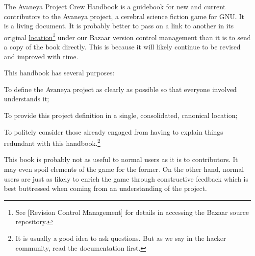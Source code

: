 

The Avaneya Project Crew Handbook is a guidebook for new and current contributors to the Avaneya project, a cerebral science fiction game for GNU. It is a living document. It is probably better to pass on a link to another in its original \href{http://bazaar.launchpad.net/~avaneya/avaneya/trunk/view/head:/Documentation/Contributors/Handbook/Avaneya\%20Crew\%20Handbook.pdf}{location}\footnote[]{See [Revision Control Management] for details in accessing the Bazaar source repository.} under our Bazaar version control management than it is to send a copy of the book directly. This is because it will likely continue to be revised and improved with time.

This handbook has several purposes:

\startitemize[R]
\item
To define the Avaneya project as clearly as possible so that everyone involved understands it;

\item
To provide this project definition in a single, consolidated, canonical location;

\item
To politely consider those already engaged from having to explain things redundant with this handbook.\footnote[rtfm]{It is usually a good idea to ask questions. But as we say in the hacker community, read the documentation first.}
\stopitemize

This book is probably not as useful to normal users as it is to contributors. It may even spoil elements of the game for the former. On the other hand, normal users are just as likely to enrich the game through constructive feedback which is best buttressed when coming from an understanding of the project.

\StopChapter

